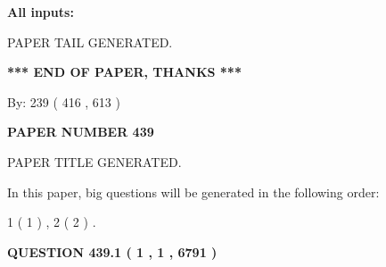 \documentclass{ctexart}
\begin{document}
   
   
   
\noindent{}
   
   
   
   
\noindent\vspace{0.1in}\hspace{-0.08in} {\textbf{\Large{All inputs: }}}
   
   
   
   
   
   
 \vspace{0.2in}
 
   
   
\vspace{2.0in} PAPER TAIL GENERATED.
   
   
   
   
\vspace{1.0in} 
{\textbf{\large{ *** END OF PAPER, THANKS *** }}} 
   
   
\hspace{1.0in} By: 
 239 ( 416 ,  613 )
   
   
   
   
\newpage 
\setcounter{page}{ 
   439001 } 
   
   
   
   
 {\textbf{ \Large{ PAPER NUMBER  439  }}}
   
   
\vspace{0.2in}
   
   
   
   
   
   
   
   
 \vspace{0.2in}
 
 
 
 
   
   
 PAPER TITLE GENERATED.
   
   
   
\vspace{0.2in}
   
In this paper, big questions will be generated in the following order: 
   
   
   1 ( 1 )
 ,
   2 ( 2 )
 .
  
\vspace{0.2in}
  
{\textbf{\Large{QUESTION
439.1 
 ( 1 , 1 , 6791 )
}}}
  
\end{document}
